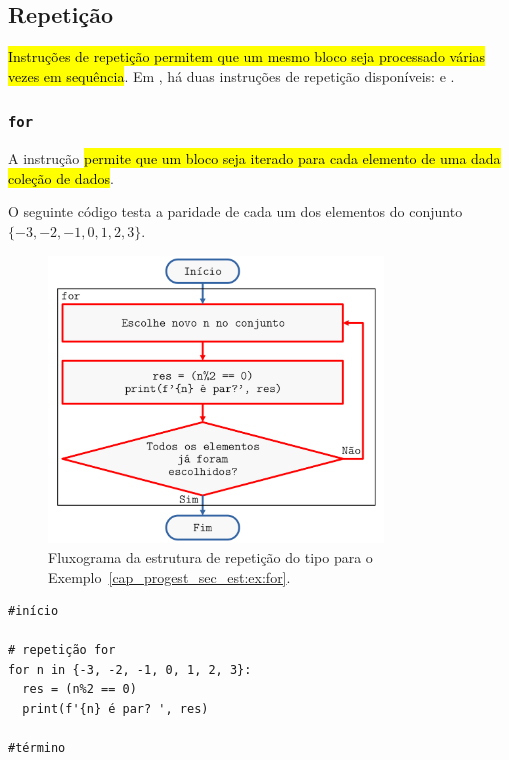 \subsection{Repetição}

\hl{Instruções de repetição permitem que um mesmo bloco seja processado várias vezes em sequência}. Em {\python}, há duas instruções de repetição disponíveis: {\PYTHONfor} e {\PYTHONwhile}. 

\subsubsection{\texttt{for}}

A instrução \hl{{\PYTHONfor} permite que um bloco seja iterado para cada elemento de uma dada coleção de dados}.

\begin{ex}\label{cap_progest_sec_est:ex:for}
  O seguinte código testa a paridade de cada um dos elementos do conjunto $\{-3, -2, -1, 0, 1, 2, 3\}$.

  \begin{figure}[htb]
    \centering
    \includegraphics[width=3.5in]{./cap_progest/dados/fig_fg_for/fig.png}
    \caption{Fluxograma da estrutura de repetição do tipo {\PYTHONfor} para o Exemplo~\ref{cap_progest_sec_est:ex:for}.}
    \label{cap_progest_sec_est:fig:fg_for}
  \end{figure}
  
  

\begin{lstlisting}
#início

# repetição for
for n in {-3, -2, -1, 0, 1, 2, 3}:
  res = (n%2 == 0)
  print(f'{n} é par? ', res)
    
#término
\end{lstlisting}


\end{ex}
